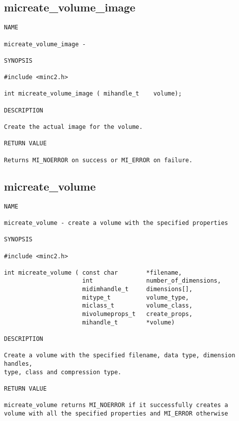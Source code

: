 \documentclass{article}
\begin{document}
\subsection{micreate\_volume\_image}
\begin{verbatim}
NAME

micreate_volume_image - 

SYNOPSIS

#include <minc2.h>

int micreate_volume_image ( mihandle_t    volume);

DESCRIPTION

Create the actual image for the volume.

RETURN VALUE

Returns MI_NOERROR on success or MI_ERROR on failure.
\end{verbatim}

\subsection{micreate\_volume}
\begin{verbatim}
NAME

micreate_volume - create a volume with the specified properties

SYNOPSIS

#include <minc2.h>

int micreate_volume ( const char        *filename,
                      int               number_of_dimensions,
                      midimhandle_t     dimensions[],
                      mitype_t          volume_type,
                      miclass_t         volume_class,
                      mivolumeprops_t   create_props,
                      mihandle_t        *volume)

DESCRIPTION

Create a volume with the specified filename, data type, dimension handles,
type, class and compression type.

RETURN VALUE

micreate_volume returns MI_NOERROR if it successfully creates a
volume with all the specified properties and MI_ERROR otherwise
\end{verbatim}
\end{document}
